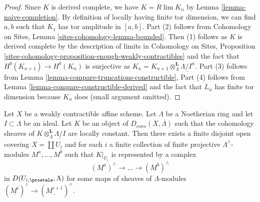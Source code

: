 \begin{proof}
Since $K$ is derived complete, we have $K = R\lim K_n$ by
Lemma \ref{lemma-naive-completion}.
By definition of locally having finite tor dimension, we can find
$a, b$ such that $K_1$ has tor amplitude in $[a, b]$.
Part (2) follows from 
Cohomology on Sites, Lemma \ref{sites-cohomology-lemma-bounded}.
Then (1) follows as $K$ is derived complete by the description
of limits in
Cohomology on Sites, Proposition
\ref{sites-cohomology-proposition-enough-weakly-contractibles}
and the fact that $H^b(K_{n + 1}) \to H^b(K_n)$ is surjective
as $K_n = K_{n + 1} \otimes^\mathbf{L}_\Lambda \underline{\Lambda/I^n}$.
Part (3) follows from
Lemma \ref{lemma-compare-truncations-constructible},
Part (4) follows from
Lemma \ref{lemma-compare-constructible-derived}
and the fact that $L_n$ has finite tor dimension because $K_n$ does
(small argument omitted).
\end{proof}

\begin{lemma}
\label{lemma-local-structure-constructible-complex}
Let $X$ be a weakly contractible affine scheme. Let $\Lambda$ be a Noetherian
ring and let $I \subset \Lambda$ be an ideal. Let $K$ be an object of
$D_{cons}(X, \Lambda)$ such that the cohomology sheaves of
$K \otimes_\Lambda^\mathbf{L} \underline{\Lambda/I}$ are locally
constant. Then there exists a finite disjoint open covering
$X = \coprod U_i$ and for each $i$ a finite collection of
finite projective $\Lambda^\wedge$-modules $M^a, \ldots, M^b$
such that $K|_{U_i}$ is represented by a complex
$$
(\underline{M^a})^\wedge \to \ldots \to (\underline{M^b})^\wedge
$$
in $D(U_{i, \proetale}, \Lambda)$ for some maps of sheaves of
$\Lambda$-modules $(\underline{M^i})^\wedge \to (\underline{M^{i + 1}})^\wedge$.
\end{lemma}

